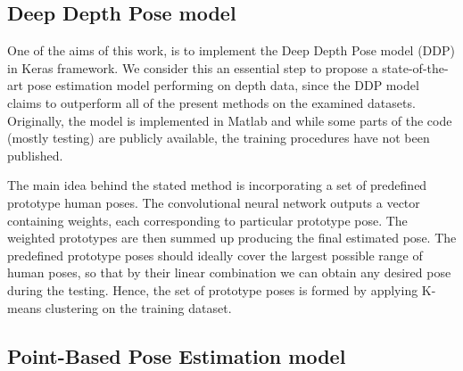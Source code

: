 \subsection{Deep Depth Pose model}
One of the aims of this work, is to implement the Deep Depth Pose model (DDP) \cite{Marin18jvcir} in Keras framework. We consider this an essential step to propose a state-of-the-art pose estimation model performing on depth data, since the DDP model claims to outperform all of the present methods on the examined datasets. Originally, the model is implemented in Matlab and while some parts of the code (mostly testing) are publicly available, the training procedures have not been published.\par
\vspace{5mm}
\noindent
The main idea behind the stated method is incorporating a set of predefined prototype human poses. The convolutional neural network outputs a vector containing weights, each corresponding to particular prototype pose. The weighted prototypes are then summed up producing the final estimated pose. The predefined prototype poses should ideally cover the largest possible range of human poses, so that by their linear combination we can obtain any desired pose during the testing. Hence, the set of prototype poses is formed by applying K-means clustering on the training dataset.

\subsection{Point-Based Pose Estimation model}

